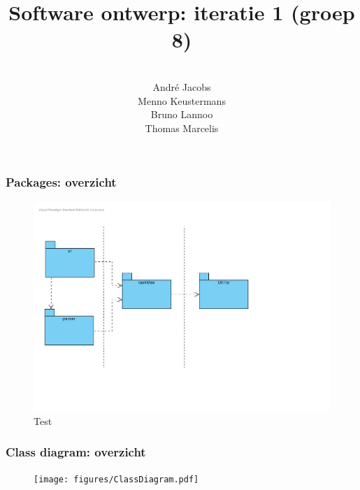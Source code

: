 \documentclass{beamer}
\title[Software ontwerp: iteratie 1]{Software ontwerp: iteratie 1 (groep 8)} %
\author[Groep 8]{\\
        Andr\'e Jacobs \\
        Menno Keustermans\\
        Bruno Lannoo \\
        Thomas Marcelis} %
\institute[KULeuven] %
{\\ %
\medskip
\textit{} %
}
\date{} %
\begin{document}
\begin{frame}
\titlepage %
\end{frame}



%       

\begin{frame}
\frametitle {Packages: overzicht}
\begin{figure}
\centering
\includegraphics[width=1.3\textwidth]{figures/PackageDiagram.pdf}
\caption{Test}
\end{figure}
\end{frame}

%
%
%

\begin{frame}
\frametitle {Class diagram: overzicht}
\vspace{-1.4cm}
\begin{figure}
\centering
\begin{center}
\texttt{[image: figures/ClassDiagram.pdf]}
\end{center}

\end{figure}
\end{frame}
\end{document}
